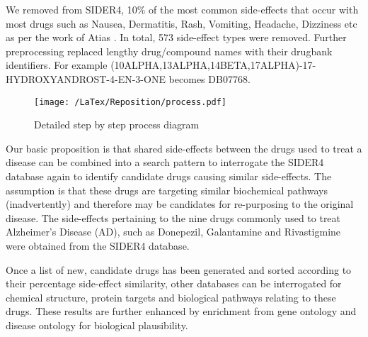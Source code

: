 \documentclass[preprint,11pt]{elsarticle}
\begin{document}
We removed from SIDER4, 10\% of the most common side-effects that occur with most drugs such as Nausea, Dermatitis, Rash, Vomiting, Headache, Dizziness etc as per the work of Atias \cite{Atias2011}. In total, 573 side-effect types were removed. Further preprocessing replaced lengthy drug/compound names with their drugbank identifiers. For example (10ALPHA,13ALPHA,14BETA,17ALPHA)-17-HYDROXYANDROST-4-EN-3-ONE becomes DB07768.

\begin{figure*}[h]
  \begin{center}
	 \texttt{[image: /LaTex/Reposition/process.pdf]} %
  \end{center}
 \caption{Detailed step by step process diagram}
\label{process}
\end{figure*}

Our basic proposition is that shared side-effects between the drugs used to treat a disease can be combined into a search pattern to interrogate the SIDER4 database again to identify candidate drugs causing similar side-effects. The assumption is that these drugs are targeting similar biochemical pathways (inadvertently) and therefore may be candidates for re-purposing to the original disease. The side-effects pertaining to the nine drugs commonly used to treat Alzheimer's Disease (AD),  such as Donepezil, Galantamine and Rivastigmine were obtained from the SIDER4 database.

Once a list of new, candidate drugs has been generated and sorted according to their percentage side-effect similarity, other databases can be interrogated for chemical structure, protein targets and biological pathways relating to these drugs. These results are further enhanced by enrichment from gene ontology and disease ontology for biological plausibility.

\end{document}
